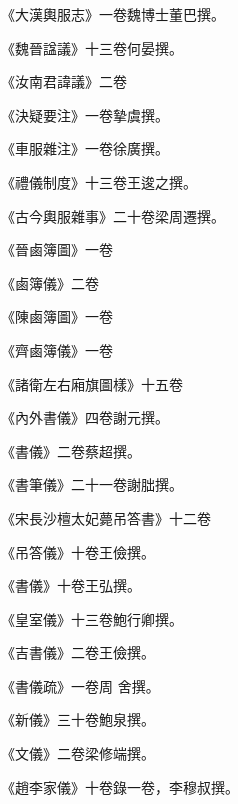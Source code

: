 \begin{pinyinscope}
 《大漢輿服志》一卷魏博士董巴撰。



 《魏晉諡議》十三卷何晏撰。



 《汝南君諱議》二卷



 《決疑要注》一卷摯虞撰。



 《車服雜注》一卷徐廣撰。



 《禮儀制度》十三卷王逡之撰。



 《古今輿服雜事》二十卷梁周遷撰。



 《晉鹵簿圖》一卷



 《鹵簿儀》二卷



 《陳鹵簿圖》一卷



 《齊鹵簿儀》一卷



 《諸衛左右廂旗圖樣》十五卷



 《內外書儀》四卷謝元撰。



 《書儀》二卷蔡超撰。



 《書筆儀》二十一卷謝朏撰。



 《宋長沙檀太妃薨吊答書》十二卷



 《吊答儀》十卷王儉撰。



 《書儀》十卷王弘撰。



 《皇室儀》十三卷鮑行卿撰。



 《吉書儀》二卷王儉撰。



 《書儀疏》一卷周
 舍撰。



 《新儀》三十卷鮑泉撰。



 《文儀》二卷梁修端撰。



 《趙李家儀》十卷錄一卷，李穆叔撰。




\end{pinyinscope}
